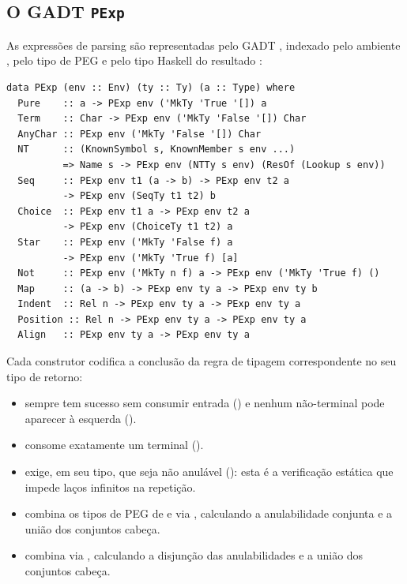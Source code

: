 \subsection{O GADT \texttt{PExp}}

As expressões de parsing são representadas pelo GADT ,
indexado pelo ambiente , pelo tipo de PEG  e
pelo tipo Haskell do resultado :

\begin{verbatim}
data PExp (env :: Env) (ty :: Ty) (a :: Type) where
  Pure    :: a -> PExp env ('MkTy 'True '[]) a
  Term    :: Char -> PExp env ('MkTy 'False '[]) Char
  AnyChar :: PExp env ('MkTy 'False '[]) Char
  NT      :: (KnownSymbol s, KnownMember s env ...)
          => Name s -> PExp env (NTTy s env) (ResOf (Lookup s env))
  Seq     :: PExp env t1 (a -> b) -> PExp env t2 a
          -> PExp env (SeqTy t1 t2) b
  Choice  :: PExp env t1 a -> PExp env t2 a
          -> PExp env (ChoiceTy t1 t2) a
  Star    :: PExp env ('MkTy 'False f) a
          -> PExp env ('MkTy 'True f) [a]
  Not     :: PExp env ('MkTy n f) a -> PExp env ('MkTy 'True f) ()
  Map     :: (a -> b) -> PExp env ty a -> PExp env ty b
  Indent  :: Rel n -> PExp env ty a -> PExp env ty a
  Position :: Rel n -> PExp env ty a -> PExp env ty a
  Align   :: PExp env ty a -> PExp env ty a
\end{verbatim}

Cada construtor codifica a conclusão da regra de tipagem correspondente
no seu tipo de retorno:

\begin{itemize}
  \item {} sempre tem sucesso sem consumir entrada
    () e nenhum não-terminal pode aparecer à esquerda
    ().
  \item {} consome exatamente um terminal
    ().
  \item {} exige, em seu tipo, que  seja não
    anulável (): esta é a verificação estática
    que impede laços infinitos na repetição.
  \item {} combina os tipos de PEG de  e
     via , calculando a anulabilidade
    conjunta e a união dos conjuntos cabeça.
  \item {} combina via ,
    calculando a disjunção das anulabilidades e a união dos conjuntos
    cabeça.
\end{itemize}


